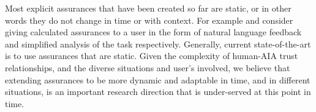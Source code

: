Most explicit assurances that have been created so far are static, or in other words they do not change in time or with context. For example \cite{Wang2016-id} and \cite{Aitken2016-fb} consider giving calculated assurances to a user in the form of natural language feedback and simplified analysis of the task respectively. Generally, current state-of-the-art is to use assurances that are static. Given the complexity of human-AIA trust relationships, and the diverse situations and user's involved, we believe that extending assurances to be more dynamic and adaptable in time, and in different situations, is an important research direction that is under-served at this point in time.
